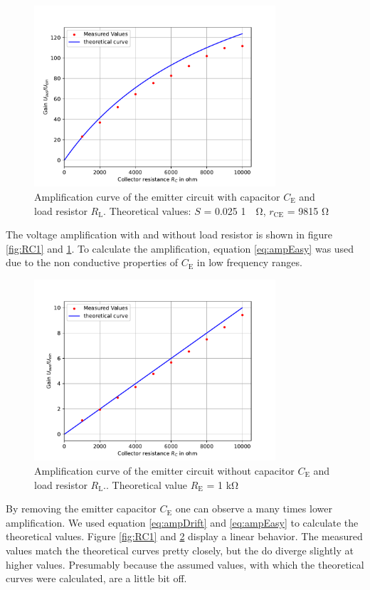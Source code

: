 \documentclass[11pt, a4paper]{article}
\begin{document}
\begin{figure}[h]
    \centering
    \includegraphics[width=0.8\textwidth]{plots/RC3.pdf}
    \caption{Amplification curve of the emitter circuit with capacitor $C_{\text{E}}$ and load resistor $R_{\text{L}}$. Theoretical values: $S$ = 0.025 \si{1 \per \ohm}, $r_{\text{CE}}$ = 9815 \si{\ohm}}
    \label{fig:RC3}
\end{figure}
The voltage amplification with and without load resistor is shown in figure \ref{fig:RC1} and \ref{fig:RC3}. To calculate the amplification, equation \ref{eq:ampEasy} was used due to the non conductive properties of $C_{\text{E}}$ in low frequency ranges.
\begin{figure}[h]
    \centering
    \includegraphics[width=0.8\textwidth]{plots/RC2.pdf}
    \caption{Amplification curve of the emitter circuit without capacitor $C_{\text{E}}$ and load resistor $R_{\text{L}}.$. Theoretical value $R_{\text{E}}$ = 1 \si{\kilo\ohm}}
    \label{fig:RC2}
\end{figure}
By removing the emitter capacitor $C_{\text{E}}$ one can observe a many times lower amplification. We used equation \ref{eq:ampDrift} and \ref{eq:ampEasy} to calculate the theoretical values.
Figure \ref{fig:RC1} and \ref{fig:RC2} display a linear behavior.
The measured values match the theoretical curves pretty closely, but the do diverge slightly at higher values. Presumably because the assumed values, with which the theoretical curves were calculated, are a little bit off.
\end{document}
